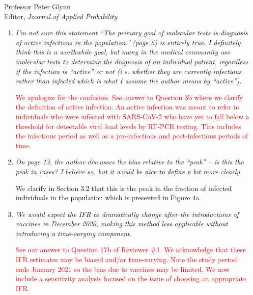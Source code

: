 \documentclass[11pt]{letter} %
\begin{document}
\begin{letter}{Professor
	Peter Glynn\\
	Editor, {\em Journal of Applied Probability}}
\begin{enumerate}
\vspace{5mm}
We now make this distinction much clearer.  The section focuses primarily on RT-PCR tests given they are the primary molecular test offered by the Indiana's State Department of Health (ISDH) and thus the basis for the case count and testing data in this paper.
\vspace{5mm}

\item {\it I’m not sure this statement “The primary goal of molecular tests is diagnosis of active infections in the population.” (page 5) is entirely true. I definitely think this is a worthwhile goal, but many in the medical community use molecular tests to determine the diagnosis of an individual patient, regardless if the infection is “active” or not (i.e. whether they are currently infectious rather than infected which is what I assume the author means by “active”).}

\vspace{5mm}
\textcolor{red}{We apologize for the confusion.  See answer to Question 3b where we clarify the definition of active infection.  An active infection was meant to refer to individuals who were infected with SARS-CoV-2 who have yet to fall below a threshold for detectable viral load levels by RT-PCR testing.  This includes the infectious period as well as a pre-infectious and post-infectious periods of time.}

\vspace{5mm}
\item {\it On page 13, the author discusses the bias relative to the “peak” – is this the peak in cases? I believe so, but it would be nice to define a bit more clearly.}

\vspace{5mm}
We clarify in Section 3.2 that this is the peak in the fraction of infected individuals in the population which is presented in Figure 4a.
\vspace{5mm}
\item {\it We would expect the IFR to dramatically change after the introductions of vaccines in December 2020, making this method less applicable without introducing a time-varying component.}

\vspace{5mm}
\textcolor{red}{See our answer to Question 17b of Reviewer \#1. We acknowledge that these IFR estimates may be biased and/or time-varying.  Note the study period ends January 2021 so the bias due to vaccines may be limited.  We now include a sensitivity analysis focused on the issue of choosing an appropriate IFR.}


\end{enumerate}
\end{letter}
\end{document}
